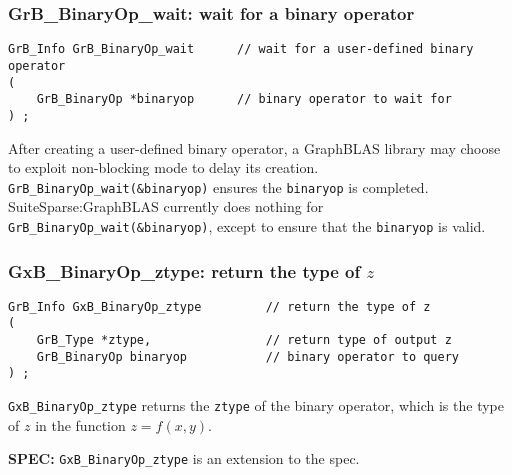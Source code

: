 \documentclass[12pt]{article}
\begin{document}
\subsubsection{{\sf GrB\_BinaryOp\_wait:} wait for a binary operator}

\begin{mdframed}[userdefinedwidth=6in]
{\footnotesize
\begin{verbatim}
GrB_Info GrB_BinaryOp_wait      // wait for a user-defined binary operator
(
    GrB_BinaryOp *binaryop      // binary operator to wait for
) ;
\end{verbatim}
}\end{mdframed}

After creating a user-defined binary operator, a GraphBLAS library may choose
to exploit non-blocking mode to delay its creation.
\verb'GrB_BinaryOp_wait(&binaryop)' ensures the \verb'binaryop' is completed.
SuiteSparse:GraphBLAS currently does nothing for
\verb'GrB_BinaryOp_wait(&binaryop)', except to ensure that the \verb'binaryop'
is valid.

\subsubsection{{\sf GxB\_BinaryOp\_ztype:} return the type of $z$}
\label{binaryop_ztype}

\begin{mdframed}[userdefinedwidth=6in]
{\footnotesize
\begin{verbatim}
GrB_Info GxB_BinaryOp_ztype         // return the type of z
(
    GrB_Type *ztype,                // return type of output z
    GrB_BinaryOp binaryop           // binary operator to query
) ;
\end{verbatim}
} \end{mdframed}

\verb'GxB_BinaryOp_ztype'
returns the \verb'ztype' of the binary operator, which is the
type of $z$ in the function $z=f(x,y)$.

\begin{spec}
{\bf SPEC:} \verb'GxB_BinaryOp_ztype' is an extension to the spec.
\end{spec}
\end{document}
